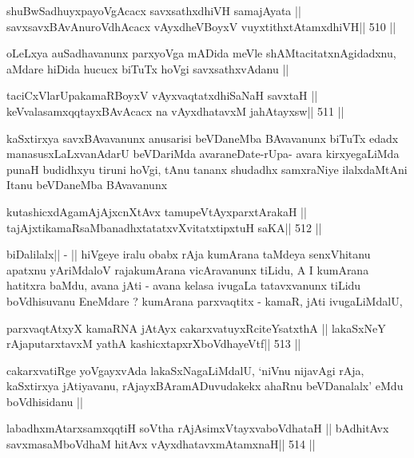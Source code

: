 \begin{shl}
shuBwSadhuyxpayoVgAcacx savxsathxdhiVH samajAyata ||
savxsavxBAvAnuroVdhAcacx vAyxdheVBoyxV vuyxtithxtAtamxdhiVH\hfill || 510 ||
\end{shl}

\begin{artha}
oLeLxya auSadhavanunx parxyoVga mADida meVle shAMtacitatxnAgidadxnu,
aMdare hiDida hucucx biTuTx hoVgi savxsathxvAdanu ||
\end{artha}

\begin{shl}
taciCxVlarUpakamaRBoyxV vAyxvaqtatxdhiSaNaH savxtaH ||
keVvalasamxqqtayxBAvAcacx na vAyxdhatavxM jahAtayxsw\hfill || 511 ||
\end{shl}

\begin{artha}
kaSxtirxya savxBAvavanunx anusarisi beVDaneMba BAvavanunx biTuTx edadx
manasusxLaLxvanAdarU beVDariMda avaraneDate-rUpa- avara kirxyegaLiMda
punaH budidhxyu tiruni hoVgi, tAnu tananx shudadhx samxraNiye
ilalxdaMtAni Itanu beVDaneMba BAvavanunx
\end{artha}

\begin{shl}
kutashicxdAgamAjAjxcnXtAvx tamupeVtAyxparxtArakaH ||
tajAjxtikamaRsaMbanadhxtatatxvXvitatxtipxtuH saKA\hfill || 512 ||
\end{shl}

\begin{artha}
biDalilalx|| - || hiVgeye iralu obabx rAja kumArana taMdeya
senxVhitanu apatxnu yAriMdaloV rajakumArana vicAravanunx tiLidu, A I
kumArana hatitxra baMdu, avana jAti - avana kelasa ivugaLa
tatavxvanunx tiLidu boVdhisuvanu EneMdare ? kumArana parxvaqtitx -
kamaR, jAti ivugaLiMdalU,  
\end{artha}

\begin{shl}
parxvaqtAtxyX kamaRNA jAtAyx cakarxvatuyxRciteYsatxthA ||
lakaSxNeY rAjaputarxtavxM yathA kashicxtapxrXboVdhayeVtf\hfill || 513 ||
\end{shl}

\begin{artha}
cakarxvatiRge yoVgayxvAda lakaSxNagaLiMdalU, `niVnu nijavAgi rAja,
kaSxtirxya jAtiyavanu, rAjayxBAramADuvudakekx ahaRnu beVDanalalx' eMdu
boVdhisidanu ||
\end{artha}

\begin{shl}
labadhxmAtarxsamxqqtiH soV\s tha rAjA\s simxVtayxvaboVdhataH ||
bAdhitAvx savxmasaMboVdhaM hitAvx vAyxdhatavxmAtamxnaH\hfill || 514 ||
\end{shl}

